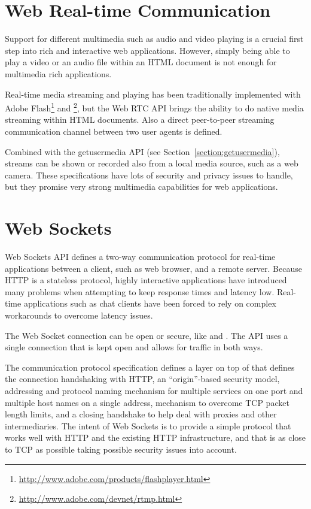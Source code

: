 \section{Web Real-time Communication}

Support for different multimedia such as audio and video playing is a
crucial first step into rich and interactive web
applications. However, simply being able to play a video or an audio
file within an HTML document is not enough for multimedia rich
applications.

Real-time media streaming and playing has been traditionally
implemented with Adobe
Flash\footnote{\url{http://www.adobe.com/products/flashplayer.html}}
and \footnote{\url{http://www.adobe.com/devnet/rtmp.html}},
but the Web RTC API \cite{WebRTC} brings the ability to do native
media streaming within HTML documents. Also a direct peer-to-peer
streaming communication channel between two user agents is defined.

Combined with the getusermedia API \cite{getusermedia} (see
Section~\ref{section:getusermedia}), streams can be shown or recorded
also from a local media source, such as a web camera. These
specifications have lots of security and privacy issues to handle, but
they promise very strong multimedia capabilities for web applications.

\section{Web Sockets}

Web Sockets API \cite{WebSockets, WebSocketProtocol} defines a two-way
communication protocol for real-time applications between a client,
such as web browser, and a remote server. Because HTTP is a stateless
protocol, highly interactive applications have introduced many
problems when attempting to keep response times and latency
low. Real-time applications such as chat clients have been forced to
rely on complex workarounds to overcome latency issues.

The Web Socket connection can be open or secure, like  and
. The API uses a single  connection that is kept
open and allows for traffic in both ways. \cite{WebSockets,
  WebSocketProtocol}

The communication protocol specification defines a layer on top of
 that defines the connection handshaking with HTTP, an
``origin''-based security model, addressing and protocol naming
mechanism for multiple services on one port and multiple host names on
a single  address, mechanism to overcome TCP packet length
limits, and a closing handshake to help deal with proxies and other
intermediaries. The intent of Web Sockets is to provide a simple
protocol that works well with HTTP and the existing HTTP
infrastructure, and that is as close to TCP as possible taking
possible security issues into account. \cite{WebSocketProtocol}

